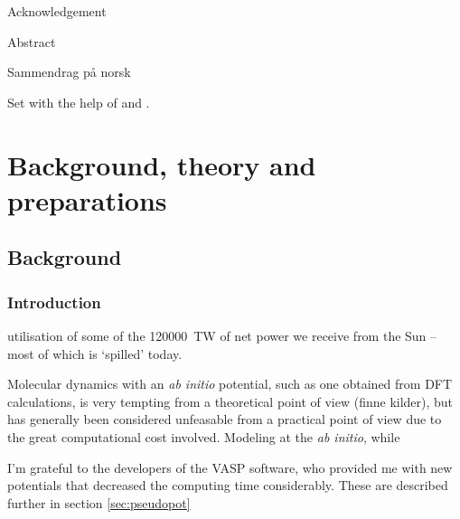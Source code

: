 \documentclass[11pt,bibliography=totoc,index=totoc]{scrbook}   %
\begin{document}
\frontmatter


Acknowledgement

Abstract

Sammendrag på norsk

Set with the help of {\LaTeXe} and {\KOMAScript}.


\tableofcontents

\mainmatter
\pagestyle{scrheadings}

\part{Background, theory and preparations}

\chapter{Background} %

\section{Introduction}




utilisation of some of the \SI{120000}{\tera\watt}
of net power we receive from the Sun -- most of which is `spilled' today. 

Molecular dynamics with an \textit{ab initio} potential, such as one obtained from DFT calculations, is very tempting from a theoretical point of view (finne kilder), but has generally been considered unfeasable from a practical point of view due to the great computational cost involved.
Modeling at the \textit{ab initio}, while 


I'm grateful to the developers of the VASP software, who provided me with new potentials that decreased the computing time considerably. These are described further in section \ref{sec:pseudopot}
\end{document}
